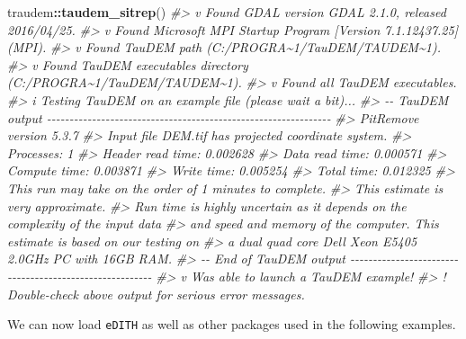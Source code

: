 \documentclass[
]{article}
\newenvironment{Shaded}{\begin{snugshade}}{\end{snugshade}}
\newcommand{\CommentTok}[1]{\textcolor[rgb]{0.56,0.35,0.01}{\textit{#1}}}
\newcommand{\FunctionTok}[1]{\textcolor[rgb]{0.13,0.29,0.53}{\textbf{#1}}}
\newcommand{\NormalTok}[1]{#1}
\newcommand{\SpecialCharTok}[1]{\textcolor[rgb]{0.81,0.36,0.00}{\textbf{#1}}}
\begin{document}
\begin{Shaded}
\begin{Highlighting}[]
\NormalTok{traudem}\SpecialCharTok{::}\FunctionTok{taudem\_sitrep}\NormalTok{()}
\CommentTok{\#\textgreater{} v Found GDAL version GDAL 2.1.0, released 2016/04/25.}
\CommentTok{\#\textgreater{} v Found Microsoft MPI Startup Program [Version 7.1.12437.25] (MPI).}
\CommentTok{\#\textgreater{} v Found TauDEM path (C:/PROGRA\textasciitilde{}1/TauDEM/TAUDEM\textasciitilde{}1).}
\CommentTok{\#\textgreater{} v Found TauDEM executables directory (C:/PROGRA\textasciitilde{}1/TauDEM/TAUDEM\textasciitilde{}1).}
\CommentTok{\#\textgreater{} v Found all TauDEM executables.}
\CommentTok{\#\textgreater{} i Testing TauDEM on an example file (please wait a bit)...}
\CommentTok{\#\textgreater{} {-}{-} TauDEM output {-}{-}{-}{-}{-}{-}{-}{-}{-}{-}{-}{-}{-}{-}{-}{-}{-}{-}{-}{-}{-}{-}{-}{-}{-}{-}{-}{-}{-}{-}{-}{-}{-}{-}{-}{-}{-}{-}{-}{-}{-}{-}{-}{-}{-}{-}{-}{-}{-}{-}{-}{-}{-}{-}{-}{-}{-}{-}{-}{-}{-}{-}{-}}
\CommentTok{\#\textgreater{} PitRemove version 5.3.7}
\CommentTok{\#\textgreater{} Input file DEM.tif has projected coordinate system.}
\CommentTok{\#\textgreater{} Processes: 1}
\CommentTok{\#\textgreater{} Header read time: 0.002628}
\CommentTok{\#\textgreater{} Data read time: 0.000571}
\CommentTok{\#\textgreater{} Compute time: 0.003871}
\CommentTok{\#\textgreater{} Write time: 0.005254}
\CommentTok{\#\textgreater{} Total time: 0.012325}
\CommentTok{\#\textgreater{} This run may take on the order of 1 minutes to complete.}
\CommentTok{\#\textgreater{} This estimate is very approximate. }
\CommentTok{\#\textgreater{} Run time is highly uncertain as it depends on the complexity of the input data }
\CommentTok{\#\textgreater{} and speed and memory of the computer. This estimate is based on our testing on }
\CommentTok{\#\textgreater{} a dual quad core Dell Xeon E5405 2.0GHz PC with 16GB RAM.}
\CommentTok{\#\textgreater{} {-}{-} End of TauDEM output {-}{-}{-}{-}{-}{-}{-}{-}{-}{-}{-}{-}{-}{-}{-}{-}{-}{-}{-}{-}{-}{-}{-}{-}{-}{-}{-}{-}{-}{-}{-}{-}{-}{-}{-}{-}{-}{-}{-}{-}{-}{-}{-}{-}{-}{-}{-}{-}{-}{-}{-}{-}{-}{-}{-}{-}}
\CommentTok{\#\textgreater{} v Was able to launch a TauDEM example!}
\CommentTok{\#\textgreater{} ! Double{-}check above output for serious error messages.}
\end{Highlighting}
\end{Shaded}

We can now load \texttt{eDITH} as well as other packages used in the following examples.
\end{document}
